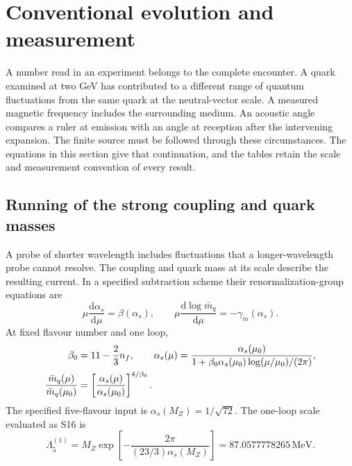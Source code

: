\documentclass[aps,prx,onecolumn,10pt,notitlepage,nofootinbib,longbibliography]{revtex4-2}
\numberwithin{equation}{section}
\numberwithin{table}{section}
\newcommand{\dd}{\mathrm d}
\newcommand{\MeV}{\,\mathrm{MeV}}
\begin{document}
\section{Conventional evolution and measurement}
\label{sec:evolution}


A number read in an experiment belongs to the complete encounter. A quark examined at two GeV has contributed to a different range of quantum fluctuations from the same quark at the neutral-vector scale. A measured magnetic frequency includes the surrounding medium. An acoustic angle compares a ruler at emission with an angle at reception after the intervening expansion. The finite source must be followed through these circumstances. The equations in this section give that continuation, and the tables retain the scale and measurement convention of every result.

\subsection{Running of the strong coupling and quark masses}
A probe of shorter wavelength includes fluctuations that a longer-wavelength probe cannot resolve. The coupling and quark mass at its scale describe the resulting current. In a specified subtraction scheme their renormalization-group equations are
\begin{equation}
 \mu\frac{\dd\alpha_s}{\dd\mu}=\beta(\alpha_s),\qquad
 \mu\frac{\dd\log\bar m_q}{\dd\mu}=-\gamma_m(\alpha_s).
\end{equation}
At fixed flavour number and one loop,
\begin{align}
 \beta_0&=11-\frac23n_f,\qquad
 \alpha_s(\mu)=\frac{\alpha_s(\mu_0)}
 {1+\beta_0\alpha_s(\mu_0)\log(\mu/\mu_0)/(2\pi)},\notag\\
 \frac{\bar m_q(\mu)}{\bar m_q(\mu_0)}
 &=\left[\frac{\alpha_s(\mu)}{\alpha_s(\mu_0)}\right]^{4/\beta_0}.
\end{align}
The specified five-flavour input is $\alpha_s(M_Z)=1/\sqrt{72}$. The one-loop scale evaluated as S16 is
\begin{equation}
 \Lambda_5^{(1)}=M_Z\exp\!\left[-\frac{2\pi}{(23/3)\alpha_s(M_Z)}\right]
 =87.0577778265\MeV.
\end{equation}
\end{document}
